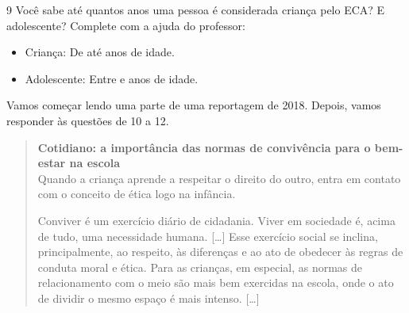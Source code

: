 \num{9} Você sabe até quantos anos uma pessoa é considerada criança pelo ECA? E
adolescente? Complete com a ajuda do professor:

\begin{itemize}
\item Criança: De  até  anos de idade.

\item Adolescente: Entre  e  anos de idade.
\end{itemize}



Vamos começar lendo uma parte de uma reportagem de 2018. Depois, vamos responder às questões de 10 a 12.

\begin{quote}
\textbf{Cotidiano: a importância das normas de convivência para o bem-estar na escola}\\
Quando a criança aprende a respeitar o direito do outro, entra em
contato com o conceito de ética logo na infância.

Conviver é um exercício diário de cidadania. Viver em sociedade é, acima
de tudo, uma necessidade humana. {[}\ldots{}{]} Esse exercício social se inclina,
principalmente, ao respeito, às diferenças e ao ato de obedecer às
regras de conduta moral e ética. Para as crianças, em especial, as
normas de relacionamento com o meio são mais bem exercidas na escola,
onde o ato de dividir o mesmo espaço é mais intenso. {[}\ldots{}{]}

\end{quote}

